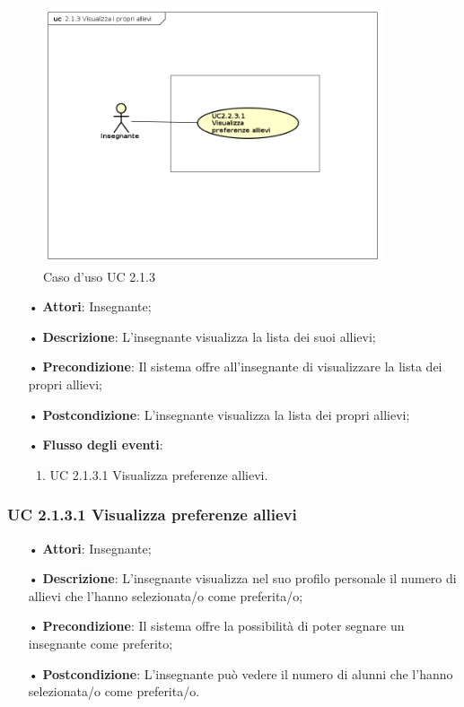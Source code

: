\begin{figure}[H]
\centering
\includegraphics[width=10cm]{img/UC213.png} 
\caption{Caso d'uso UC 2.1.3}
\end{figure}

\begin{itemize}
	\item[•] \textbf{Attori}: Insegnante;
	\item[•] \textbf{Descrizione}: L’insegnante visualizza la lista dei suoi allievi;
	\item[•] \textbf{Precondizione}: Il sistema offre all’insegnante di visualizzare la lista dei propri allievi;
	\item[•] \textbf{Postcondizione}: L’insegnante visualizza la lista dei propri allievi;
	\item[•] \textbf{Flusso degli eventi}:
		\begin{enumerate}
			\item UC 2.1.3.1 Visualizza preferenze allievi.
		\end{enumerate}
\end{itemize}

\subsubsection{UC 2.1.3.1 Visualizza preferenze allievi}
\begin{itemize}
	\item[•] \textbf{Attori}: Insegnante;
	\item[•] \textbf{Descrizione}: L’insegnante visualizza nel suo profilo personale il numero di allievi che l'hanno selezionata/o come preferita/o;
	\item[•] \textbf{Precondizione}: Il sistema offre la possibilità di poter segnare un insegnante come preferito;
	\item[•] \textbf{Postcondizione}: L’insegnante può vedere il numero di alunni che l'hanno selezionata/o come preferita/o.
\end{itemize}



